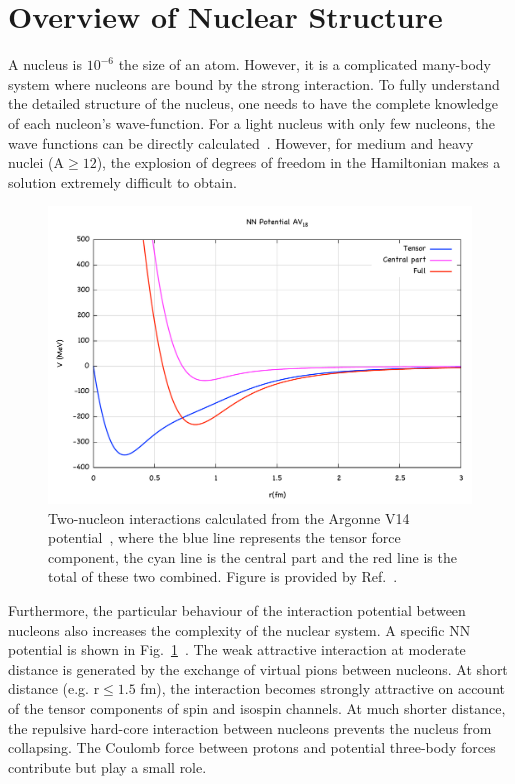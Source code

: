 \section{Overview of Nuclear Structure}
  A nucleus is $\mathrm{10^{-6}}$ the size of an atom. However, it is a complicated many-body system where nucleons are bound by the strong interaction. To fully understand the detailed structure of the nucleus, one needs to have the complete knowledge of each nucleon's wave-function. For a light nucleus with only few nucleons, the wave functions can be directly calculated~\cite{PhysRevLett.87.172502}. However, for medium and heavy nuclei ($\mathrm{A\geq 12}$), the explosion of degrees of freedom in the Hamiltonian makes a solution extremely difficult to obtain.
\begin{figure}[!ht]
  \begin{center}
    \includegraphics[type=pdf,ext=.pdf,read=.pdf,width=0.80\linewidth]{./figures/physics/CentralTensorFull}
    \caption[Two-nucleon interactions]{\footnotesize{Two-nucleon interactions calculated from the Argonne V14 potential~\cite{PhysRevC.51.38}, where the blue line represents the tensor force component, the cyan line is the central part and the red line is the total of these two combined. Figure is provided by Ref.~\cite{donal_prvt}.}}
    \label{potential_well}
  \end{center}
\end{figure}

Furthermore, the particular behaviour of the interaction potential between nucleons also increases the complexity of the nuclear system. A specific NN potential is shown in Fig.~\ref{potential_well}~\cite{PhysRevC.51.38}. The weak attractive interaction at moderate distance is generated by the exchange of virtual pions between nucleons. At short distance (e.g. $\mathrm{r\leq 1.5}$ fm), the interaction becomes strongly attractive on account of the tensor components of spin and isospin channels. At much shorter distance, the repulsive hard-core interaction between nucleons prevents the nucleus from collapsing. The Coulomb force between protons and potential three-body forces contribute but play a small role.

